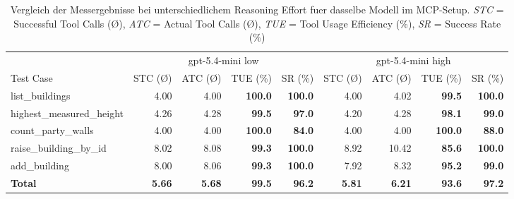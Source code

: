 \begin{table}[htbp]
\centering
\scriptsize
\begin{tabular}{lrrrr|rrrr}
\toprule
& \multicolumn{4}{c}{gpt-5.4-mini low} & \multicolumn{4}{c}{gpt-5.4-mini high} \\
\cmidrule(lr){2-5}\cmidrule(lr){6-9}
Test Case
& \multicolumn{1}{c}{STC (\O)}
& \multicolumn{1}{c}{ATC (\O)}
& \multicolumn{1}{c}{TUE (\%)}
& \multicolumn{1}{c}{SR (\%)}
& \multicolumn{1}{c}{STC (\O)}
& \multicolumn{1}{c}{ATC (\O)}
& \multicolumn{1}{c}{TUE (\%)}
& \multicolumn{1}{c}{SR (\%)} \\
\midrule
list\_buildings & 4.00 & 4.00 & \textbf{100.0} & \textbf{100.0} & 4.00 & 4.02 & \textbf{99.5} & \textbf{100.0} \\
highest\_measured\_height & 4.26 & 4.28 & \textbf{99.5} & \textbf{97.0} & 4.20 & 4.28 & \textbf{98.1} & \textbf{99.0} \\
count\_party\_walls & 4.00 & 4.00 & \textbf{100.0} & \textbf{84.0} & 4.00 & 4.00 & \textbf{100.0} & \textbf{88.0} \\
raise\_building\_by\_id & 8.02 & 8.08 & \textbf{99.3} & \textbf{100.0} & 8.92 & 10.42 & \textbf{85.6} & \textbf{100.0} \\
add\_building & 8.00 & 8.06 & \textbf{99.3} & \textbf{100.0} & 7.92 & 8.32 & \textbf{95.2} & \textbf{99.0} \\
\midrule
\textbf{Total} & \textbf{5.66} & \textbf{5.68} & \textbf{99.5} & \textbf{96.2} & \textbf{5.81} & \textbf{6.21} & \textbf{93.6} & \textbf{97.2} \\
\bottomrule
\end{tabular}
\caption{Vergleich der Messergebnisse bei unterschiedlichem Reasoning Effort fuer dasselbe Modell im MCP-Setup.
\newline
\textit{STC} = Successful Tool Calls (\O),\;
\textit{ATC} = Actual Tool Calls (\O),\;
\textit{TUE} = Tool Usage Efficiency (\%),\;
\textit{SR} = Success Rate (\%)}
\label{tab:reasoning_effort_gpt54mini_low_high}
\end{table}
